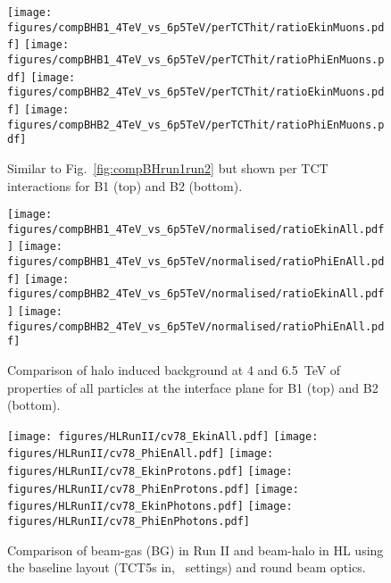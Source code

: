 \begin{figure}
  \begin{center}
  \texttt{[image: figures/compBHB1\_4TeV\_vs\_6p5TeV/perTCThit/ratioEkinMuons.pdf]}
  \texttt{[image: figures/compBHB1\_4TeV\_vs\_6p5TeV/perTCThit/ratioPhiEnMuons.pdf]}
  \texttt{[image: figures/compBHB2\_4TeV\_vs\_6p5TeV/perTCThit/ratioEkinMuons.pdf]}
  \texttt{[image: figures/compBHB2\_4TeV\_vs\_6p5TeV/perTCThit/ratioPhiEnMuons.pdf]}
\end{center}
\vspace{-0.6cm}
 \caption{Similar to Fig.~\ref{fig:compBHrun1run2} but shown per TCT interactions for B1 (top) and B2 (bottom).
  \label{fig:compBHrun1run2PerTCT}}
\end{figure}



\begin{figure}%
\begin{center}
  \texttt{[image: figures/compBHB1\_4TeV\_vs\_6p5TeV/normalised/ratioEkinAll.pdf]}
  \texttt{[image: figures/compBHB1\_4TeV\_vs\_6p5TeV/normalised/ratioPhiEnAll.pdf]}
  \texttt{[image: figures/compBHB2\_4TeV\_vs\_6p5TeV/normalised/ratioEkinAll.pdf]}
  \texttt{[image: figures/compBHB2\_4TeV\_vs\_6p5TeV/normalised/ratioPhiEnAll.pdf]}
\end{center}
\vspace{-0.6cm}
 \caption{Comparison of halo induced background at 4 and 6.5~TeV of properties of all particles at the interface plane for B1 (top) and B2 (bottom).
  \label{compBHrun1run22}}
\end{figure}



\begin{figure}
\begin{center}
  \texttt{[image: figures/HLRunII/cv78\_EkinAll.pdf]}
  \texttt{[image: figures/HLRunII/cv78\_PhiEnAll.pdf]}
  \texttt{[image: figures/HLRunII/cv78\_EkinProtons.pdf]}
  \texttt{[image: figures/HLRunII/cv78\_PhiEnProtons.pdf]}
  \texttt{[image: figures/HLRunII/cv78\_EkinPhotons.pdf]}
  \texttt{[image: figures/HLRunII/cv78\_PhiEnPhotons.pdf]}
\end{center}
\vspace{-0.6cm}
 \caption{Comparison of beam-gas (BG) in Run II and beam-halo in HL using the baseline layout (TCT5s in, \twosigmaret~settings) and round beam optics.
  \label{fig:hlrun22}}
\end{figure}



